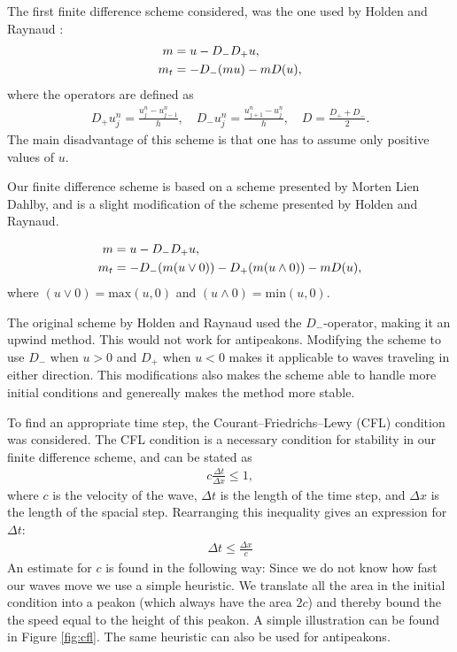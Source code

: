 The first finite difference scheme considered, was the one used by Holden and Raynaud \cite{holden2006convergence}:
\begin{align}
m &= u - D_{-}D_{+}u, \notag \\ 
m_t &= -D_{-}(mu) - mD(u),
\end{align}
where the operators are defined as
\begin{align}
\label{eq:operators}
D_{+}u_{j}^{n} = \frac{u_{j}^{n}-u_{j-1}^{n}}{h},\quad
D_{-}u_{j}^{n} = \frac{u_{j+1}^{n}-u_{j}^{n}}{h},\quad
D = \frac{D_{+}+D_{-}}{2}.
\end{align}
The main disadvantage of this scheme is that one has to assume only positive values of $u$.

Our finite difference scheme is based on a scheme presented by Morten Lien Dahlby\cite{dahlby2007geometric}, and is a slight modification of the scheme presented by Holden and Raynaud.

\begin{align}
m &= u - D_{-}D_{+}u, \notag \\ 
m_t &= -D_{-}(m(u \vee 0)) -D_{+}(m(u \wedge 0)) - mD(u), 
\label{eq:modscheme}
\end{align}
where $(u \vee 0) = \text{max}(u,0)$ and $(u \wedge 0) = \text{min}(u,0)$.

The original scheme by Holden and Raynaud used the $D_{-}$-operator, making it an upwind method. This would not work for antipeakons. Modifying the scheme to use  $D_{-}$ when $u > 0$ and $D_{+}$ when $ u < 0$ makes it applicable to waves traveling in either direction. This modifications also makes the scheme able to handle more initial conditions and genereally makes the method more stable. 

To find an appropriate time step, the Courant–Friedrichs–Lewy (CFL) condition was considered. The CFL condition is a necessary condition for stability in our finite difference scheme, and can be stated as
\begin{align*}
c\frac{\Delta t}{\Delta x} \leq 1,
\end{align*}
where $c$ is the velocity of the wave, $\Delta t$ is the length of the time step, and $\Delta x$ is the length of the spacial step. Rearranging this inequality gives an expression for $\Delta t$:
\begin{align*}
\Delta t \leq \frac{\Delta x}{c}
\end{align*}
An estimate for $c$ is found in the following way: Since we do not know how fast our waves move we use a simple heuristic. We translate all the area in the initial condition into a peakon (which always have the area $2c$) and thereby bound the the speed equal to the height of this peakon. A simple illustration can be found in Figure \ref{fig:cfl}. The same heuristic can also be used for antipeakons.


